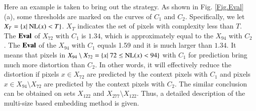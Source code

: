 \documentclass[review,3p,10pt,sort&compress]{elsarticle}
\begin{document}
Here an example is taken to bring out the strategy. As shown in Fig. \ref{Fig.Eval}(a), some thresholds are marked on the curves of $C_1$ and $C_2$. Specifically, we let $X_{T} = \{x |\ {\rm NL}(x) < T\}$. $X_{T}$ indicates the set of pixels with complexity less than $T$. The ${\rm \mathbf{Eval}}$ of $X_{72}$ with $C_1$ is $1.34$, which is approximately equal to the $X_{94}$ with $C_2$. The ${\rm \mathbf{Eval}}$ of the $X_{94}$ with $C_1$ equals 1.59 and it is much larger than $1.34$. It means that pixels in $X_{94} \setminus X_{72} = \{x|\ 72 \leq {\rm NL}(x) < 94\}$ with $C_1$ for prediction bring much more distortion than $C_2$. In other words, it will effectively reduce the distortion if pixels $x \in X_{72}$ are predicted by the context pixels with $C_1$ and pixels $x \in X_{94} \setminus X_{72}$ are predicted by the context pixels with $C_2$. The similar conclusion can be obtained on sets $X_{122}$ and $X_{277} \setminus X_{122}$. Thus, a detailed description of the multi-size based embedding method is given.
\end{document}
